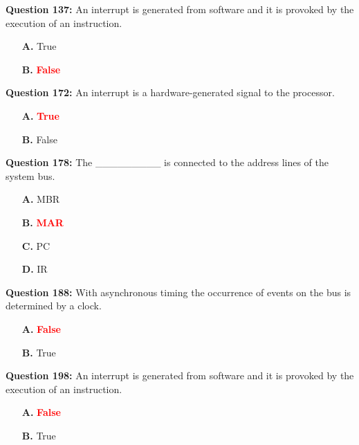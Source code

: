 \documentclass[12pt,a4paper]{article}
\begin{document}
\vspace{0.5cm}

\textbf{Question 137:} An interrupt is generated from software and it is provoked by the execution of an instruction.

\begin{itemize}
    \item[\textbf{A.}] True
    \item[\textbf{B.}] \textcolor{red}{\textbf{False}}
\end{itemize}

\vspace{0.5cm}

\textbf{Question 172:} An interrupt is a hardware-generated signal to the processor.

\begin{itemize}
    \item[\textbf{A.}] \textcolor{red}{\textbf{True}}
    \item[\textbf{B.}] False
\end{itemize}

\vspace{0.5cm}

\textbf{Question 178:} The _________ is connected to the address lines of the system bus.

\begin{itemize}
    \item[\textbf{A.}] MBR
    \item[\textbf{B.}] \textcolor{red}{\textbf{MAR}}
    \item[\textbf{C.}] PC
    \item[\textbf{D.}] IR
\end{itemize}

\vspace{0.5cm}

\textbf{Question 188:} With asynchronous timing the occurrence of events on the bus is determined by a clock.

\begin{itemize}
    \item[\textbf{A.}] \textcolor{red}{\textbf{False}}
    \item[\textbf{B.}] True
\end{itemize}

\vspace{0.5cm}

\textbf{Question 198:} An interrupt is generated from software and it is provoked by the execution of an instruction.

\begin{itemize}
    \item[\textbf{A.}] \textcolor{red}{\textbf{False}}
    \item[\textbf{B.}] True
\end{itemize}
\end{document}
